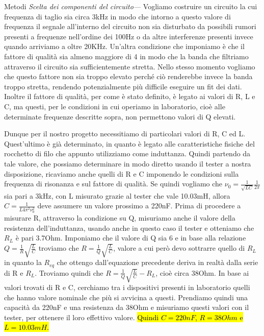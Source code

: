 \documentclass[
    rmp,
    reprint, 
    superscriptaddress, 
    altaffilletter, 
    amsmath, 
    amssymb, 
    a4paper]{revtex4-2}
\begin{document}
\begin{methods}{Metodi}
    \noindent\textit{Scelta dei componenti del circuito---}\label{par:caratterizzazioneRLC} Vogliamo costruire un circuito la cui frequenza di taglio sia circa 3kHz in modo che intorno a questo valore di frequenza il segnale all'interno del circuito non sia disturbato da possibili rumori presenti a frequenze nell'ordine dei 100Hz o da altre interferenze presenti invece quando arriviamo a oltre 20KHz. Un'altra condizione che imponiamo è che il fattore di qualità sia almeno maggiore di 4 in modo che la banda che filtriamo attraverso il circuito sia sufficientemente stretta. Nello stesso momento vogliamo che questo fattore non sia troppo elevato perch\'e ci\`o renderebbe invece la banda troppo stretta, rendendo potenzialmente più difficile eseguire un fit dei dati. Inoltre il fattore di qualità, per come è stato definito, è legato ai valori di R, L e C, ma questi, per le condizioni in cui operiamo in laboratorio, cioè alle determinate frequenze descritte sopra, non permettono valori di Q elevati. 
    
    Dunque per il nostro progetto necessitiamo di particolari valori di R, C ed L. Quest'ultimo è già determinato, in quanto è legato alle caratteristiche fisiche del rocchetto di filo che appunto utilizziamo come induttanza. Quindi partendo da tale valore, che possiamo determinare in modo diretto usando il tester a nostra disposizione, ricaviamo anche quelli di R e C imponendo le condizioni sulla frequenza di risonanza e sul fattore di qualità. Se quindi vogliamo che $\nu_{0}=\frac{1}{\sqrt{LC}}\frac{1}{2\pi}$ sia pari a 3kHz, con L misurato grazie al tester che vale 10.03mH, allora $C=\frac{1}{L4\pi^2\nu_{0}^2}$ deve assumere un valore prossimo a 220nF. Prima di procedere a misurare R, attraverso la condizione su Q, misuriamo anche il valore della resistenza dell'induttanza, usando anche in questo caso il tester e otteniamo che $R_{L}$ è pari 3.7Ohm. Imponiamo che il valore di Q sia 6 e in base alla relazione $Q=\frac{1}{R}\sqrt{\frac{L}{C}}$ troviamo che $R=\frac{1}{Q}\sqrt{\frac{L}{C}}$, valore a cui però devo sottrarre quello di $R_{L}$ in quanto la $R_{eq}$ che ottengo dall'equazione precedente deriva in realtà dalla serie di R e $R_{L}$. Troviamo quindi che $R=\frac{1}{Q}\sqrt{\frac{L}{C}}-R_{L}$, cioè circa 38Ohm. In base ai valori trovati di R e C, cerchiamo tra i dispositivi presenti in laboratorio quelli che hanno valore nominale che più si avvicina a questi. Prendiamo quindi una capacità da 220nF e una resistenza da 38Ohm e misuriamo questi valori con il tester, per ottenere il loro effettivo valore. \hl{Quindi $C=220nF$, $R=38Ohm$ e $L=10.03mH$.}


\end{methods}
\end{document}
